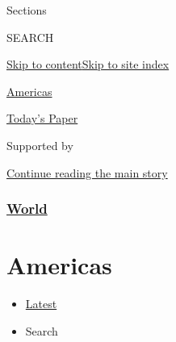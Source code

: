 Sections

SEARCH

\protect\hyperlink{site-content}{Skip to
content}\protect\hyperlink{site-index}{Skip to site index}

\href{https://www.nytimes.com/section/world/americas}{Americas}

\href{https://myaccount.nytimes.com/auth/login?response_type=cookie\&client_id=vi}{}

\href{https://www.nytimes.com/section/todayspaper}{Today's Paper}

Supported by

\protect\hyperlink{after-sponsor}{Continue reading the main story}

\hypertarget{world}{%
\subsubsection{\texorpdfstring{\href{/section/world}{World}}{World}}\label{world}}

\hypertarget{americas}{%
\section{Americas}\label{americas}}

\begin{itemize}
\tightlist
\item
  \protect\hyperlink{stream-panel}{Latest}
\item
  Search
\end{itemize}


